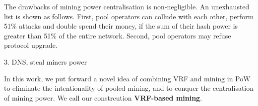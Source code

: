 The drawbacks of mining power centralisation is non-negligible.
An unexhausted list is shown as follows.
First, pool operators can collude with each other, perform 51\% attacks and double spend their money, if the sum of their hash power is greater than 51\% of the entire network.
Second, 
pool operators may refuse protocol upgrade. 

3. DNS, steal miners power



In this work, we put forward a novel idea of combining VRF and mining in PoW to eliminate the intentionality of pooled mining, and to conquer the centralisation of mining power. We call our constrcution \textbf{VRF-based mining}.